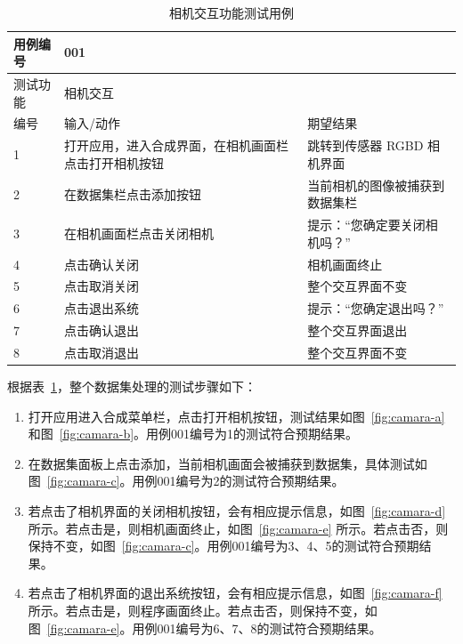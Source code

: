 \begin{table}[thbp]
	\centering
	\small{}\setlength{}
	\caption{相机交互功能测试用例}
	\begin{tabular}{|p{2cm}<{\centering}|p{4cm}<{\centering}|p{4cm}<{\centering}|}
		\hline
		用例编号 & \multicolumn{2}{|l|}{001}       \\
		\hline
		测试功能 & \multicolumn{2}{|l|}{相机交互}       \\
		\hline
		编号 & 输入/动作 & 期望结果 \\
		\hline
		1 & 打开应用，进入合成界面，在相机画面栏点击打开相机按钮 & 跳转到传感器 RGBD 相机界面 \\
		\hline
		2 & 在数据集栏点击添加按钮 & 当前相机的图像被捕获到数据集栏 \\
		\hline
		3 & 在相机画面栏点击关闭相机 & 提示：“您确定要关闭相机吗？” \\
		\hline
		4 & 点击确认关闭 & 相机画面终止 \\
		\hline
		5 & 点击取消关闭 & 整个交互界面不变 \\
		\hline
		6 & 点击退出系统 & 提示：“您确定退出吗？” \\
		\hline
		7 & 点击确认退出 & 整个交互界面退出 \\
		\hline
		8 & 点击取消退出 & 整个交互界面不变 \\
		\hline
	\end{tabular}
	\label{tab:camera}
\end{table}
根据表~\ref{tab:camera}，整个数据集处理的测试步骤如下：
\begin{enumerate}
	\item[1)] 打开应用进入合成菜单栏，点击打开相机按钮，测试结果如图~\ref{fig:camara-a} 和图~\ref{fig:camara-b}。用例001编号为1的测试符合预期结果。
	\item[2)] 在数据集面板上点击添加，当前相机画面会被捕获到数据集，具体测试如图~\ref{fig:camara-c}。用例001编号为2的测试符合预期结果。
	\item[3)] 若点击了相机界面的关闭相机按钮，会有相应提示信息，如图~\ref{fig:camara-d} 所示。若点击是，则相机画面终止，如图~\ref{fig:camara-e} 所示。若点击否，则保持不变，如图~\ref{fig:camara-c}。用例001编号为3、4、5的测试符合预期结果。
	\item[4)] 若点击了相机界面的退出系统按钮，会有相应提示信息，如图~\ref{fig:camara-f} 所示。若点击是，则程序画面终止。若点击否，则保持不变，如图~\ref{fig:camara-e}。用例001编号为6、7、8的测试符合预期结果。
\end{enumerate}

